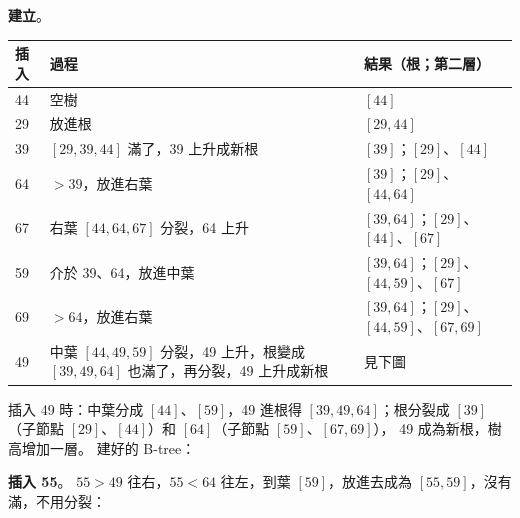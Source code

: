 \begin{pastsoln}
\textbf{建立}。
\begin{center}
\small
\begin{tabular}{lp{6.4cm}l}
\toprule
插入 & 過程 & 結果（根；第二層） \\
\midrule
44 & 空樹 & $[44]$ \\
29 & 放進根 & $[29, 44]$ \\
39 & $[29, 39, 44]$ 滿了，39 上升成新根 & $[39]$；$[29]$、$[44]$ \\
64 & $> 39$，放進右葉 & $[39]$；$[29]$、$[44, 64]$ \\
67 & 右葉 $[44, 64, 67]$ 分裂，64 上升 & $[39, 64]$；$[29]$、$[44]$、$[67]$ \\
59 & 介於 39、64，放進中葉 & $[39, 64]$；$[29]$、$[44, 59]$、$[67]$ \\
69 & $> 64$，放進右葉 & $[39, 64]$；$[29]$、$[44, 59]$、$[67, 69]$ \\
49 & 中葉 $[44, 49, 59]$ 分裂，49 上升，根變成 $[39, 49, 64]$ 也滿了，再分裂，49 上升成新根 & 見下圖 \\
\bottomrule
\end{tabular}
\end{center}
插入 49 時：中葉分成 $[44]$、$[59]$，49 進根得 $[39, 49, 64]$；根分裂成 $[39]$（子節點 $[29]$、$[44]$）和 $[64]$（子節點 $[59]$、$[67, 69]$），
49 成為新根，樹高增加一層。 建好的 B-tree：
\begin{center}
\end{center}

\textbf{插入 55}。 $55 > 49$ 往右，$55 < 64$ 往左，到葉 $[59]$，放進去成為 $[55, 59]$，沒有滿，不用分裂：
\begin{center}
\end{center}


\end{pastsoln}
